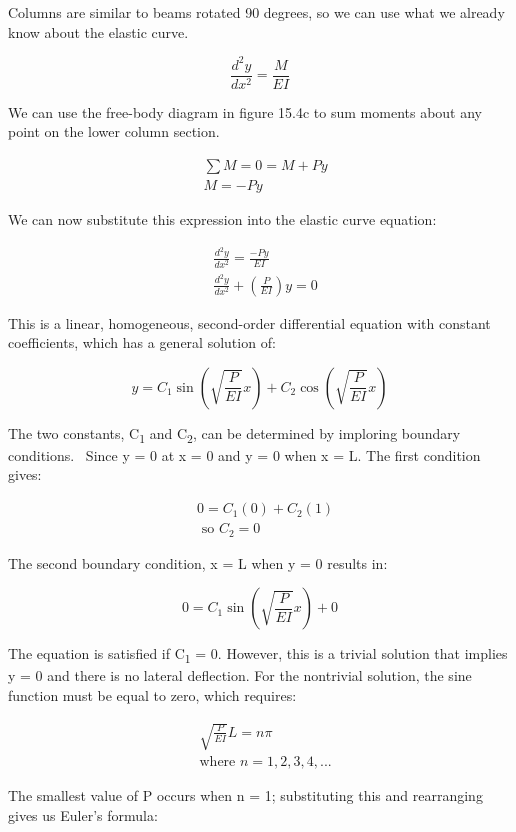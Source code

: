 \documentclass[
  letterpaper,
  DIV=11,
  numbers=noendperiod]{scrreprt}
\begin{document}
Columns are similar to beams rotated 90 degrees, so we can use what we
already know about the elastic curve.

\[
\frac{d^2 y}{d x^2}=\frac{M}{E I}
\]

We can use the free-body diagram in figure 15.4c to sum moments about
any point on the lower column section.

\[
\begin{aligned}
& \sum M=0=M+P y \\
& M=-P y
\end{aligned}
\]

We can now substitute this expression into the elastic curve equation:

\[
\begin{aligned}
& \frac{d^2 y}{d x^2}=\frac{-P y}{E I} \\
& \frac{d^2 y}{d x^2}+\left(\frac{P}{E I}\right) y=0
\end{aligned}
\]

This is a linear, homogeneous, second-order differential equation with
constant coefficients, which has a general solution of:

\[
y=C_1 \sin \left(\sqrt{\frac{P}{E I}} x\right)+C_2 \cos \left(\sqrt{\frac{P}{E I}} x\right)
\]

The two constants, C\textsubscript{1} and C\textsubscript{2}, can be
determined by imploring boundary conditions.~ Since y = 0 at x = 0 and y
= 0 when x = L. The first condition gives:

\[
\begin{aligned}
&0  =C_1(0)+C_2(1) \\
& \text { so } C_2  =0
\end{aligned}
\]

The second boundary condition, x = L when y = 0 results in:

\[
0=C_1 \sin \left(\sqrt{\frac{P}{E I}} x\right)+0
\]

The equation is satisfied if C\textsubscript{1} = 0. However, this is a
trivial solution that implies y = 0 and there is no lateral deflection.
For the nontrivial solution, the sine function must be equal to zero,
which requires:

\[
\begin{aligned}
&\sqrt{\frac{P}{E I}} L=n \pi \\
& \text {where } n=1, 2, 3, 4,...
\end{aligned}
\]

The smallest value of P occurs when n = 1; substituting this and
rearranging gives us Euler's formula:
\end{document}
